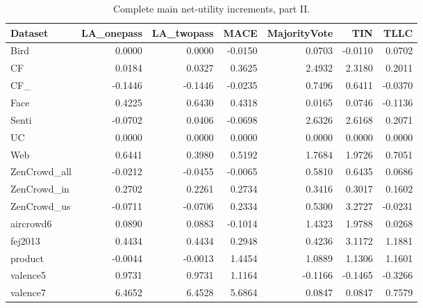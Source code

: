 \documentclass[journal]{IEEEtran}
\newcommand{\smalltable}{\footnotesize\setlength{\tabcolsep}{3.5pt}}
\begin{document}
\begin{table}[t]
\caption{Complete main net-utility increments, part II.}
\label{tab:complete2}\centering\smalltable
\begin{tabular}{lrrrrrr}
\toprule
Dataset & LA\_onepass & LA\_twopass & MACE & MajorityVote & TIN & TLLC \\
\midrule
Bird & 0.0000 & 0.0000 & -0.0150 & 0.0703 & -0.0110 & 0.0702 \\
CF & 0.0184 & 0.0327 & 0.3625 & 2.4932 & 2.3180 & 0.2011 \\
CF\_ & -0.1446 & -0.1446 & -0.0235 & 0.7496 & 0.6411 & -0.0370 \\
Face & 0.4225 & 0.6430 & 0.4318 & 0.0165 & 0.0746 & -0.1136 \\
Senti & -0.0702 & 0.0406 & -0.0698 & 2.6326 & 2.6168 & 0.2071 \\
UC & 0.0000 & 0.0000 & 0.0000 & 0.0000 & 0.0000 & 0.0000 \\
Web & 0.6441 & 0.3980 & 0.5192 & 1.7684 & 1.9726 & 0.7051 \\
ZenCrowd\_all & -0.0212 & -0.0455 & -0.0065 & 0.5810 & 0.6435 & 0.0686 \\
ZenCrowd\_in & 0.2702 & 0.2261 & 0.2734 & 0.3416 & 0.3017 & 0.1602 \\
ZenCrowd\_us & -0.0711 & -0.0706 & 0.2334 & 0.5300 & 3.2727 & -0.0231 \\
aircrowd6 & 0.0890 & 0.0883 & -0.1014 & 1.4323 & 1.9788 & 0.0268 \\
fej2013 & 0.4434 & 0.4434 & 0.2948 & 0.4236 & 3.1172 & 1.1881 \\
product & -0.0044 & -0.0013 & 1.4454 & 1.0889 & 1.1306 & 1.1601 \\
valence5 & 0.9731 & 0.9731 & 1.1164 & -0.1166 & -0.1465 & -0.3266 \\
valence7 & 6.4652 & 6.4528 & 5.6864 & 0.0847 & 0.0847 & 0.7579 \\
\bottomrule
\end{tabular}

\end{table}
\end{document}
